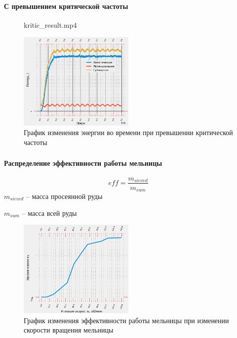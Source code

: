 \documentclass[c]{beamer}  %
\begin{document}
\begin{frame}
\frametitle{\insertsection} 
\framesubtitle{С превышением критической частоты}
\begin{figure}[ht]
     		{kritic_result.mp4}
\end{figure}
\begin{figure}[H]
	\centering
	\includegraphics[width=0.5\textwidth]{kritic_energy} 
	\caption{График изменения энергии во времени при превышении критической частоты}
\end{figure}
\end{frame}



\begin{frame}
\frametitle{\insertsection} 
\framesubtitle{Распределение эффективности работы мельницы}
\[
eff = \frac{m_{sieved}}{m_{sum}}
\]
\small $m_{sieved}$ -- масса просеянной руды

\small $m_{sum}$ -- масса всей руды
\begin{figure}[H]
	\centering
	\includegraphics[width=0.5\textwidth]{efficiency1} 
	\caption{\small График изменения эффективности работы мельницы при изменении скорости вращения мельницы}
	\label{pic:efficiency}
\end{figure} 
\end{frame}
\end{document}
